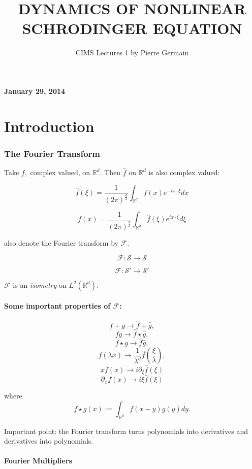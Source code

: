 \documentclass[11pt]{amsart}
\theoremstyle{plain}
\numberwithin{equation}{section}
\theoremstyle{remark}
\newcommand{\R}{\mathbb{R}}
\begin{document}
\title{DYNAMICS OF NONLINEAR SCHRODINGER EQUATION}
\author{CIMS Lectures 1 by Pierre Germain}

\maketitle

\tableofcontents

{\bf January 29, 2014}


\part{Introduction}

\section{The Fourier Transform}

Take $f,$ complex valued, on $\R^d.$ Then $\hat{f}$ on $\R^d$ is also complex valued:

$$\hat{f}(\xi) = \frac{1}{(2\pi)^\frac{d}{2}}\int_{\R^d} f(x)e^{-ix\cdot\xi} dx$$ 

$${f}(x) = \frac{1}{(2\pi)^\frac{d}{2}}\int_{\R^d} \hat{f}(\xi)e^{ix\cdot\xi} d\xi$$ 

also denote the Fourier transform by $\mathcal{F}.$ 

$$\mathcal{F} : \mathcal{S} \rightarrow \mathcal{S}$$

$$\mathcal{F} : \mathcal{S'} \rightarrow \mathcal{S'}$$

$\mathcal{F}$ is an \emph{isometry} on $L^2 (\R^d).$

\subsection{Some important properties of $\mathcal{F}$:}

$$f+g \rightarrow \hat{f} + \hat{g}, $$
$$fg \rightarrow \hat{f} \star \hat{g},$$
$$f\star g \rightarrow \hat{f} \hat{g},$$
$$f(\lambda x) \rightarrow \frac{1}{\lambda^d} \hat{f}(\frac{\xi}{\lambda}),$$
$$xf(x) \rightarrow i\partial_{\xi} \hat{f}(\xi)$$
$$\partial_{x} f(x) \longrightarrow i\xi \hat{f}(\xi)$$

where $$f\star g(x) := \int_{\R^d} f(x-y)g(y)dy.$$


Important point: the Fourier transform turns polynomials into derivatives and derivatives into polynomials. 

\subsection{Fourier Multipliers}
\end{document}
